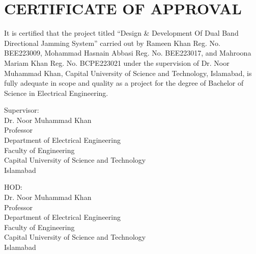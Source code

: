 \documentclass[12pt,a4paper]{report}
\begin{document}
	
	\newpage
	\chapter*{CERTIFICATE OF APPROVAL}
	
	It is certified that the project titled
	``Design \& Development Of Dual Band Directional Jamming System''
	carried out by Rameen Khan Reg. No. BEE223009,
	Mohammad Hasnain Abbasi Reg. No. BEE223017,
	and Mahroona Mariam Khan Reg. No. BCPE223021
	under the supervision of Dr. Noor Muhammad Khan,
	Capital University of Science and Technology,
	Islamabad, is fully adequate in scope and quality
	as a project for the degree of Bachelor of Science
	in Electrical Engineering.
	
	\vspace{1.5cm}
	
	\begin{center}
		
		Supervisor: \hrulefill \\
		
		Dr. Noor Muhammad Khan\\
		Professor\\
		Department of Electrical Engineering\\
		Faculty of Engineering\\
		Capital University of Science and Technology\\
		Islamabad
		
		\vspace{1.5cm}
		
		HOD: \hrulefill \\
		
		Dr. Noor Muhammad Khan\\
		Professor\\
		Department of Electrical Engineering\\
		Faculty of Engineering\\
		Capital University of Science and Technology\\
		Islamabad
		
	\end{center}
	
	
\end{document}
